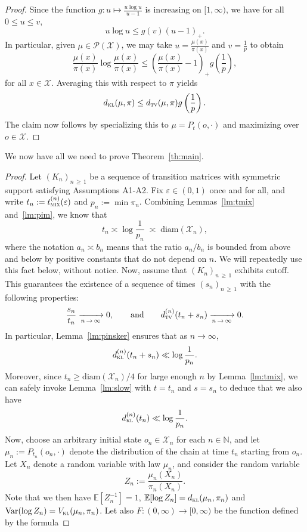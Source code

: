 \documentclass[10pt]{amsart}
\theoremstyle{definition}\newtheorem{defi}[theo]{Definition}\newtheorem{rema}[theo]{Remark}\newtheorem{exam}[theo]{Example}\newtheorem{exem}[theo]{Example}\newtheorem{nota}[theo]{Notation}
\newcommand{\EE}{{\mathbb{E}}}
\newcommand{\N}{\mathbb{N}}
\newcommand{\cX}{\mathcal{X}}
\newcommand{\cP}{\mathcal{P}}
\newcommand{\dtv}{d_{\textsc{tv}}}
\newcommand{\dkl}{d_{\textsc{kl}}}
\newcommand{\vkl}{V_{\textsc{kl}}}
\newcommand{\pim}{p}
\newcommand{\tmix}{t_{\textsc{mix}}}
\newcommand{\diam}{\mathrm{diam}}
\newcommand{\var}{{\mathrm{Var}}}
\begin{document}
\begin{proof}
Since the function $g\colon u \mapsto \frac{u\log u }{u-1}$ is increasing on $[1,\infty)$, we have for all $0\le u\le v$,
\[
u \log u \le g(v)(u-1)_+.
\]
In particular, given $\mu\in\cP(\cX)$, we may take $u=\frac{\mu(x)}{\pi(x)}$ and $v=\frac{1}{\pim}$ to obtain
\[
\frac{\mu(x)}{\pi(x)}\log \frac{\mu(x)}{\pi(x)} \le \left(\frac{\mu(x)}{\pi(x)}-1\right)_+g\left(\frac{1}{\pim}\right),
\]
for all $x\in\cX$. Averaging this with respect to $\pi$ yields
\[
\dkl(\mu,\pi) \le \dtv(\mu,\pi) g\left(\frac{1}{\pim}\right).
\]
The claim now follows by specializing this to $\mu=P_t(o,\cdot)$ and maximizing over $o\in\cX$.
\end{proof}

We now have all we need to prove Theorem~\ref{th:main}.

\begin{proof}
Let $(K_n)_{n\,\ge\,1}$ be a sequence of transition matrices with symmetric support satisfying Assumptions A1-A2. Fix $\varepsilon\in(0,1)$ once and for all, and write $t_n:=\tmix^{(n)}(\varepsilon)$ and $p_n:=\min \pi_n$. Combining Lemmas~\ref{lm:tmix} and~\ref{lm:pim}, we know that
\[
t_n \asymp \log \frac{1}{p_n} \; \asymp \;\diam(\cX_n),
\]
where the notation $a_n\asymp b_n$ means that the ratio $a_n/b_n$ is bounded from above and below by positive constants that do not depend on $n$. We will repeatedly use this fact below, without notice. Now, assume that $(K_n)_{n\,\ge\,1}$ exhibits cutoff. This guarantees the existence of a sequence of times $(s_n)_{n\,\ge\,1}$ with the following properties:
\[
\frac{s_n}{t_n} \xrightarrow[n\,\to\,\infty]{} 0, \qquad \text{and}\qquad \dtv^{(n)}(t_n+s_n) \xrightarrow[n\,\to\,\infty]{} 0.
\]
In particular, Lemma~\ref{lm:pinsker} ensures that as $n\to\infty$,
\[
\dkl^{(n)}(t_n+s_n) \ll \log \frac{1}{p_n}.
\]
Moreover, since $t_n\ge \diam(\cX_n)/4$ for large enough $n$ by Lemma~\ref{lm:tmix}, we can safely invoke Lemma~\ref{lm:slow} with $t=t_n$ and $s=s_n$ to deduce that we also have
\begin{equation}\label{half}
\dkl^{(n)}(t_n) \ll \log \frac{1}{p_n}.
\end{equation}
Now, choose an arbitrary initial state $o_n\in\cX_n$ for each $n\in\N$, and let $\mu_n:=P_{t_n}(o_n,\cdot)$ denote the distribution of the chain at time $t_n$ starting from $o_n$. Let $X_n$ denote a random variable with law $\mu_n$, and consider the random variable
\[
Z_n := \frac{\mu_n(X_n)}{\pi_n(X_n)}.
\]
Note that we then have $\EE[Z_n^{-1}]=1$, $\EE[\log Z_n]=\dkl(\mu_n,\pi_n)$ and $\var(\log Z_n)\linebreak=\vkl(\mu_n,\pi_n)$. Let also $F\colon(0,\infty)\to[0,\infty)$ be the function defined by the formula

\end{proof}
\end{document}
